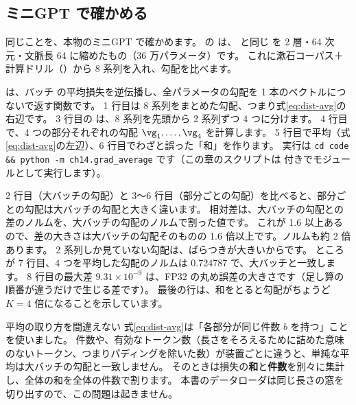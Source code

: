 \subsection*{ミニGPT で確かめる}

同じことを、本物のミニGPT で確かめます。
 の  は、 と同じ  を 2 層・64 次元・文脈長 64 に縮めたもの（36 万パラメータ）です。
これに漱石コーパス＋計算ドリル（）から 8 系列を入れ、勾配を比べます。


 は、バッチ  の平均損失を逆伝播し、全パラメータの勾配を 1 本のベクトルにつないで返す関数です。
1 行目は 8 系列をまとめた勾配、つまり式\eqref{eq:dist-avg}の右辺です。
3 行目の  は、8 系列を先頭から 2 系列ずつ 4 つに分けます。
4 行目で、4 つの部分それぞれの勾配 $\vg_1,\dots,\vg_4$ を計算します。
5 行目で平均（式\eqref{eq:dist-avg}の左辺）、6 行目でわざと誤った「和」を作ります。
実行は \texttt{cd code \&\& python -m ch14.grad\_average} です（この章のスクリプトは  付きでモジュールとして実行します）。


2 行目（大バッチの勾配）と 3〜6 行目（部分ごとの勾配）を比べると、部分ごとの勾配は大バッチの勾配と大きく違います。
相対差は、大バッチの勾配との差のノルムを、大バッチの勾配のノルムで割った値です。
これが 1.6 以上あるので、差の大きさは大バッチの勾配そのものの 1.6 倍以上です。ノルムも約 2 倍あります。
2 系列しか見ていない勾配は、ばらつきが大きいからです。
ところが 7 行目、4 つを平均した勾配のノルムは 0.724787 で、大バッチと一致します。
8 行目の最大差 $9.31\times10^{-9}$ は、FP32 の丸め誤差の大きさです（足し算の順番が違うだけで生じる差です）。
最後の行は、和をとると勾配がちょうど $K=4$ 倍になることを示しています。

\begin{caution}{平均の取り方を間違えない}
式\eqref{eq:dist-avg}は「各部分が同じ件数 $b$ を持つ」ことを使いました。
件数や、有効なトークン数（長さをそろえるために詰めた意味のないトークン、つまりパディングを除いた数）が装置ごとに違うと、単純な平均は大バッチの勾配と一致しません。
そのときは損失の\textbf{和}と\textbf{件数}を別々に集計し、全体の和を全体の件数で割ります。
本書のデータローダは同じ長さの窓を切り出すので、この問題は起きません。
\end{caution}


